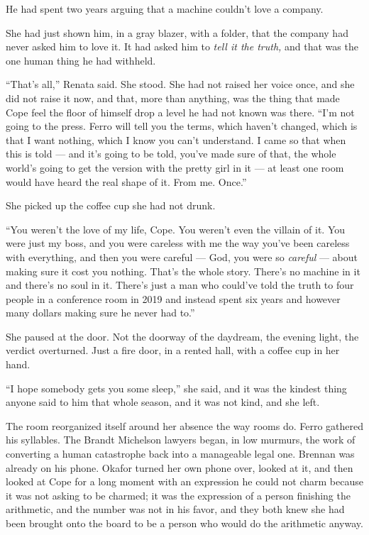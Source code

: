 \documentclass[11pt,openany]{book}
\newcommand{\scenebreak}{\par\vspace{0.5\baselineskip}\begin{center}\textasteriskcentered\quad\textasteriskcentered\quad\textasteriskcentered\end{center}\vspace{0.5\baselineskip}\par}
\begin{document}
He had spent two years arguing that a machine couldn't love a company.

She had just shown him, in a gray blazer, with a folder, that the company had never asked him to love it. It had asked him to \textit{tell it the truth,} and that was the one human thing he had withheld.


\scenebreak


``That's all,'' Renata said. She stood. She had not raised her voice once, and she did not raise it now, and that, more than anything, was the thing that made Cope feel the floor of himself drop a level he had not known was there. ``I'm not going to the press. Ferro will tell you the terms, which haven't changed, which is that I want nothing, which I know you can't understand. I came so that when this is told --- and it's going to be told, you've made sure of that, the whole world's going to get the version with the pretty girl in it --- at least one room would have heard the real shape of it. From me. Once.''

She picked up the coffee cup she had not drunk.

``You weren't the love of my life, Cope. You weren't even the villain of it. You were just my boss, and you were careless with me the way you've been careless with everything, and then you were careful --- God, you were so \textit{careful} --- about making sure it cost you nothing. That's the whole story. There's no machine in it and there's no soul in it. There's just a man who could've told the truth to four people in a conference room in 2019 and instead spent six years and however many dollars making sure he never had to.''

She paused at the door. Not the doorway of the daydream, the evening light, the verdict overturned. Just a fire door, in a rented hall, with a coffee cup in her hand.

``I hope somebody gets you some sleep,'' she said, and it was the kindest thing anyone said to him that whole season, and it was not kind, and she left.


\scenebreak


The room reorganized itself around her absence the way rooms do. Ferro gathered his syllables. The Brandt Michelson lawyers began, in low murmurs, the work of converting a human catastrophe back into a manageable legal one. Brennan was already on his phone. Okafor turned her own phone over, looked at it, and then looked at Cope for a long moment with an expression he could not charm because it was not asking to be charmed; it was the expression of a person finishing the arithmetic, and the number was not in his favor, and they both knew she had been brought onto the board to be a person who would do the arithmetic anyway.
\end{document}
